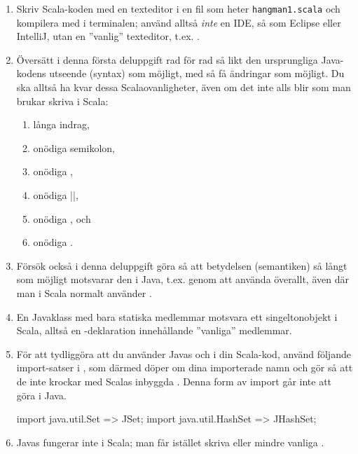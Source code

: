 \begin{enumerate}[noitemsep]

\item Skriv Scala-koden med en texteditor i en fil som heter \texttt{hangman1.scala} och kompilera med  i terminalen; använd alltså \emph{inte} en IDE, så som Eclipse eller IntelliJ, utan en ''vanlig'' texteditor, t.ex. .

\item Översätt i denna första deluppgift rad för rad så likt den ursprungliga Java-kodens utseende (syntax)  som möjligt, med så få ändringar som möjligt. Du ska alltså ha kvar dessa Scalaovanligheter, även om det inte alls blir som man brukar skriva i Scala: 
\begin{enumerate}
\item långa indrag, \item onödiga semikolon, \item onödiga \code{()}, \item onödiga \code|{}|, \item onödiga , och \item onödiga . 
\end{enumerate}

\item Försök också i denna deluppgift göra så att betydelsen (semantiken) så långt som möjligt motsvarar den i Java, t.ex. genom att använda  överallt, även där man i Scala normalt använder . 

\item En Javaklass med bara statiska medlemmar motsvara ett singeltonobjekt i Scala, alltså en -deklaration innehållande ''vanliga'' medlemmar. 
 
\item För att tydliggöra att du använder Javas  och  i din Scala-kod, använd följande import-satser i , som därmed döper om dina importerade namn och gör så att de inte krockar med Scalas inbyggda . Denna form av import går inte att göra i Java.
\begin{Code}
import java.util.{Set => JSet};
import java.util.{HashSet => JHashSet};
\end{Code}

\item Javas  fungerar inte i Scala; man får istället skriva  eller mindre vanliga .


\end{enumerate}
